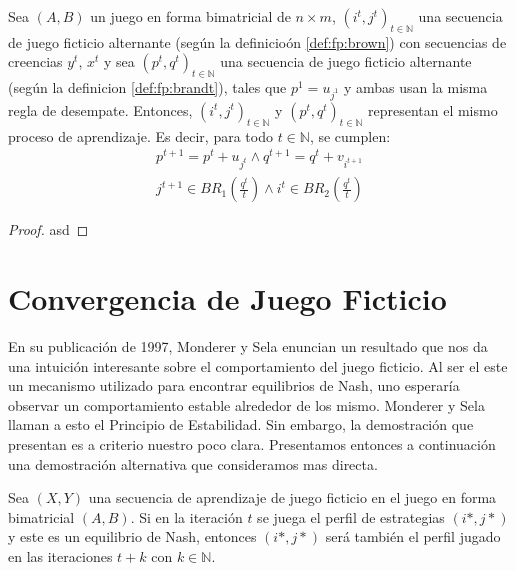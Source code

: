 \begin{theorem}
    Sea $(A, B)$ un juego en forma bimatricial de $n \times m$, $(i^t, j^t)_{t \in \mathbb{N}}$ una secuencia de juego ficticio alternante (según la definicioón \ref{def:fp:brown}) con secuencias de creencias $y^t$, $x^t$ y sea $(p^t, q^t)_{t \in \mathbb{N}}$ una secuencia de juego ficticio alternante (según la definicion \ref{def:fp:brandt}), tales que $p^1 = u_{j^1}$ y ambas usan la misma regla de desempate. Entonces, $(i^t, j^t)_{t \in \mathbb{N}}$ y $(p^t, q^t)_{t \in \mathbb{N}}$ representan el mismo proceso de aprendizaje. Es decir, para todo $t \in \mathbb{N}$, se cumplen:
    \begin{gather}
        p^{t+1} = p^{t} + u_{j^t} \land q^{t+1} = q^{t} + v_{i^{t+1}} \\
        j^{t+1} \in BR_1(\frac{q^t}{t}) \land i^{t} \in BR_2(\frac{q^t}{t})
    \end{gather}
\end{theorem}

\begin{proof}
    asd

\end{proof}

\section{Convergencia de Juego Ficticio}

En su publicación de 1997, Monderer y Sela \cite{no:cycling} enuncian un resultado que nos da una intuición interesante sobre el comportamiento del juego ficticio. Al ser el este un mecanismo utilizado para encontrar equilibrios de Nash, uno esperaría observar un comportamiento estable alrededor de los mismo. Monderer y Sela llaman a esto el Principio de Estabilidad. Sin embargo, la demostración que presentan es a criterio nuestro poco clara. Presentamos entonces a continuación una demostración alternativa que consideramos mas directa.

\begin{theorem}
    Sea $(X, Y)$ una secuencia de aprendizaje de juego ficticio en el juego en forma bimatricial $(A, B)$. Si en la iteración $t$ se juega el perfil de estrategias $(i*, j*)$ y este es un equilibrio de Nash, entonces $(i*, j*)$ será también el perfil jugado en las iteraciones $t+k$ con $k \in \mathbb{N}$.
\end{theorem}

